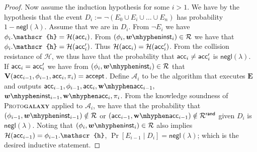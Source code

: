 \documentclass[11pt]{article} %
\newcommand{\protogal}{{\normalfont\scshape Proto\bfseries{galaxy}}\xspace}
\newcommand{\adv}{\ensuremath{\mathcal A}\xspace}
\newcommand{\negl}{\ensuremath{\mathsf{negl}(\lambda)}\xspace}
\newcommand{\accept}{\ensuremath{\mathsf{accept}}\xspace}
\newcommand{\defeq}{:=}
\newcommand{\hash}{\ensuremath{\mathcal{H}}\xspace}
\newcommand{\prf}{\ensuremath{\mathsf{\pi}}\xspace}
\newcommand{\inst}{\ensuremath{\phi}\xspace}
\newcommand{\acchash}{\ensuremath{\mathscr{h}}\xspace}
\newcommand{\ver}{\ensuremath{\mathsf{\mathbf{V}}}\xspace}
\newcommand{\rel}{\ensuremath{\mathcal{R}}\xspace}
\newcommand{\relrand}{\ensuremath{\mathcal{R^{\mathsf{rand}}}}\xspace}
\newcommand{\ext}{\ensuremath{\mathbf{E}}\xspace}
\begin{document}
\begin{proof}
Now assume the induction hypothesis for some $i>1$. We have by the hypothesis that the event $D_i\defeq \neg(E_0\cup E_i\cup\ldots\cup E_n)$ has probability $1-\negl$. Assume that we are in $D_i$.
 From $\neg E_i$ we have $\inst_{i}.\acchash=\hash(\acc_i)$. From $(\inst_{i},\witinst_{i})\in \rel$ we have that $\inst_{i}.\acchash = \hash(\acc'_{i})$.
Thus $\hash(\acc_i)=\hash(\acc'_i)$.
From the collision resistance of \hash, we thus have that the probability that $\mathsf{acc}_i\neq \mathsf{acc}'_i$ is \negl.
If $\mathsf{acc}_i=\mathsf{acc}'_i$ we have from $(\inst_i,\witinst_i)\in \rel$ that $\ver(\acc_{i-1},\inst_{i-1},\acc_i,\prf_i) =\accept$.
Define $\adv_i$ to be the algorithm that executes \ext and outputs $\acc_{i-1},\inst_{i-1},\acc_{i},\witacc_{i-1},$ $\witinst_{i-1},\witacc_i,\prf_i$.
From the knowledge soundness of \protogal applied to $\adv_i$, we have that the probability that $(\inst_{i-1},\witinst_{i-1})\notin \rel$ or $(\acc_{i-1},\witacc_{i-1})\notin \relrand$ given $D_i$ is \negl. Noting that $(\inst_i,\witinst_i)\in \rel$ also implies $\hash(\acc_{i-1}) = \inst_{i-1}.\acchash$, $\Pr[E_{i-1} \mid D_i]=\negl$; which is the desired inductive statement.
\end{proof}
\end{document}
